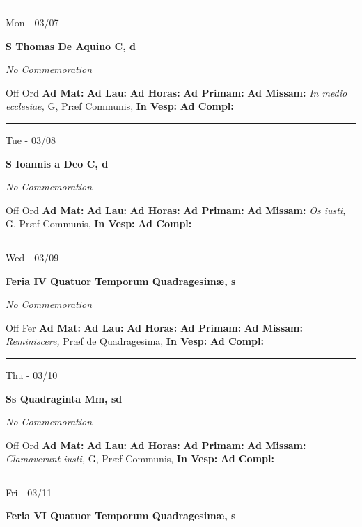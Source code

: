 \documentclass[letterpaper, 10pt]{article}
\begin{document}
\hrule
\begin{center}
Mon - 03/07
\end{center}\textbf{ \large S Thomas De Aquino C, \textnormal{\normalsize d}}

\textit{No Commemoration}\begin{justify}
Off Ord
\textbf{Ad Mat: }
\textbf{Ad Lau: }
\textbf{Ad Horas: }
\textbf{Ad Primam: }
\textbf{Ad Missam:} \textit{In medio ecclesiae, } G, Præf Communis, 
\textbf{In Vesp: }
\textbf{Ad Compl: }\end{justify}



\hrule
\begin{center}
Tue - 03/08
\end{center}\textbf{ \large S Ioannis a Deo C, \textnormal{\normalsize d}}

\textit{No Commemoration}\begin{justify}
Off Ord
\textbf{Ad Mat: }
\textbf{Ad Lau: }
\textbf{Ad Horas: }
\textbf{Ad Primam: }
\textbf{Ad Missam:} \textit{Os iusti, } G, Præf Communis, 
\textbf{In Vesp: }
\textbf{Ad Compl: }\end{justify}



\hrule
\begin{center}
Wed - 03/09
\end{center}\textbf{ \large Feria IV Quatuor Temporum Quadragesimæ, \textnormal{\normalsize s}}

\textit{No Commemoration}\begin{justify}
Off Fer
\textbf{Ad Mat: }
\textbf{Ad Lau: }
\textbf{Ad Horas: }
\textbf{Ad Primam: }
\textbf{Ad Missam:} \textit{Reminiscere, } Præf de Quadragesima, 
\textbf{In Vesp: }
\textbf{Ad Compl: }\end{justify}



\hrule
\begin{center}
Thu - 03/10
\end{center}\textbf{ \large Ss Quadraginta Mm, \textnormal{\normalsize sd}}

\textit{No Commemoration}\begin{justify}
Off Ord
\textbf{Ad Mat: }
\textbf{Ad Lau: }
\textbf{Ad Horas: }
\textbf{Ad Primam: }
\textbf{Ad Missam:} \textit{Clamaverunt iusti, } G, Præf Communis, 
\textbf{In Vesp: }
\textbf{Ad Compl: }\end{justify}



\hrule
\begin{center}
Fri - 03/11
\end{center}\textbf{ \large Feria VI Quatuor Temporum Quadragesimæ, \textnormal{\normalsize s}}
\end{document}
